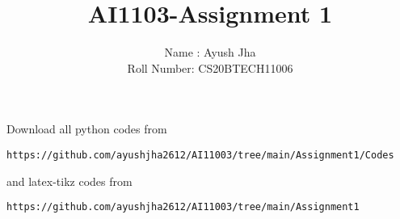 \documentclass[journal,12pt,twocolumn]{IEEEtran}
\DeclareMathOperator*{\Res}{Res}
\begin{document}
\newcommand{\BEQA}{\begin{eqnarray}}
\newcommand{\EEQA}{\end{eqnarray}}
\newcommand{\define}{\stackrel{\triangle}{=}}

\raggedbottom
\setlength{\parindent}{0pt}
\providecommand{\mbf}{\mathbf}
\providecommand{\pr}[1]{\ensuremath{\Pr\left(#1\right)}}
\providecommand{\qfunc}[1]{\ensuremath{Q\left(#1\right)}}
\providecommand{\sbrak}[1]{\ensuremath{{}\left[#1\right]}}
\providecommand{\lsbrak}[1]{\ensuremath{{}\left[#1\right.}}
\providecommand{\rsbrak}[1]{\ensuremath{{}\left.#1\right]}}
\providecommand{\brak}[1]{\ensuremath{\left(#1\right)}}
\providecommand{\lbrak}[1]{\ensuremath{\left(#1\right.}}
\providecommand{\rbrak}[1]{\ensuremath{\left.#1\right)}}
\providecommand{\cbrak}[1]{\ensuremath{\left\{#1\right\}}}
\providecommand{\lcbrak}[1]{\ensuremath{\left\{#1\right.}}
\providecommand{\rcbrak}[1]{\ensuremath{\left.#1\right\}}}
\theoremstyle{remark}
\newtheorem{rem}{Remark}
\newcommand{\sgn}{\mathop{\mathrm{sgn}}}
\providecommand{\abs}[1]{\vert#1\vert}
\providecommand{\res}[1]{\Res\displaylimits_{#1}} 
\providecommand{\norm}[1]{\lVert#1\rVert}
\providecommand{\mtx}[1]{\mathbf{#1}}
\providecommand{\mean}[1]{E[ #1 ]}
\providecommand{\fourier}{\overset{\mathcal{F}}{ \rightleftharpoons}}
\providecommand{\system}{\overset{\mathcal{H}}{ \longleftrightarrow}}
\newcommand{\solution}{\noindent \textbf{Solution: }}
\newcommand{\cosec}{\,\text{cosec}\,}
\providecommand{\dec}[2]{\ensuremath{\overset{#1}{\underset{#2}{\gtrless}}}}
\newcommand{\myvec}[1]{\ensuremath{\begin{pmatrix}#1\end{pmatrix}}}
\newcommand{\mydet}[1]{\ensuremath{\begin{vmatrix}#1\end{vmatrix}}}
\makeatletter
{}
\makeatother
\let\StandardTheFigure\thefigure
\let\vec\mathbf
\renewcommand{\thefigure}{\theproblem}
\def\putbox#1#2#3{\makebox[0in][l]{\makebox[#1][l]{}\raisebox{\baselineskip}[0in][0in]{\raisebox{#2}[0in][0in]{#3}}}}
     \def\rightbox#1{\makebox[0in][r]{#1}}
     \def\centbox#1{\makebox[0in]{#1}}
     \def\topbox#1{\raisebox{-\baselineskip}[0in][0in]{#1}}
     \def\midbox#1{\raisebox{-0.5\baselineskip}[0in][0in]{#1}}
\vspace{3cm}
\title{AI1103-Assignment 1}
\author{Name : Ayush Jha \\ Roll Number: CS20BTECH11006}
\maketitle
\newpage
\bigskip
\renewcommand{\thefigure}{\theenumi}
\renewcommand{\thetable}{\theenumi}
Download all python codes from 
\begin{lstlisting}
https://github.com/ayushjha2612/AI11003/tree/main/Assignment1/Codes
\end{lstlisting}
%
and latex-tikz codes from 
%
\begin{lstlisting}
https://github.com/ayushjha2612/AI11003/tree/main/Assignment1
\end{lstlisting}
\end{document}
